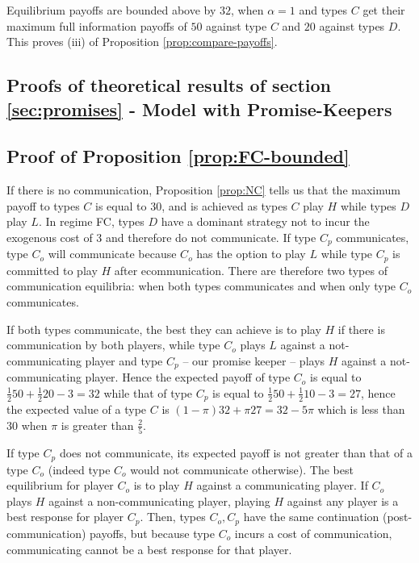 \documentclass[12pt]{article}
\theoremstyle{break}
\begin{document}
Equilibrium payoffs are bounded above by $32$, when $\alpha=1$ and types $C$ get their maximum full information payoffs of $50$ against type $C$ and $20$ against types $D$. This proves (iii) of Proposition \ref{prop:compare-payoffs}.

%   
%    
\subsection{Proofs of theoretical results of section \ref{sec:promises}  - Model with Promise-Keepers}

\subsection*{Proof of Proposition \ref{prop:FC-bounded}}

	If there is no communication, Proposition \ref{prop:NC} tells us that the maximum payoff to types $C$ is equal to $30$, and is achieved as types $C$ play $H$ while types $D$ play $L$. In regime FC, types $D$ have a dominant strategy not to incur the exogenous cost of $3$ and therefore do not communicate. If type $C_p$ communicates, type $C_o$ will communicate because $C_o$ has the option to play $L$ while type $C_p$ is committed to play $H$ after ecommunication. There are therefore two types of communication equilibria: when both types communicates and when only type $C_o$ communicates. 
	
	If both types communicate, the best they can achieve is to play $H$ if there is communication by both players, while type $C_o$ plays $L$ against a not-communicating player and type $C_p$ -- our promise keeper -- plays $H$ against a not-communicating player. Hence the expected payoff of type $C_o$ is equal to $\frac{1}{2}50+\frac{1}{2}20-3=32$ while that of type $C_p$ is equal to $\frac{1}{2}50+\frac{1}{2}10-3=27$, hence the expected value of a type $C$ is $(1-\pi)32+\pi 27=32-5\pi$ which is less than $30$ when $\pi$ is greater than $\frac{2}{5}$. 

	If type $C_p$ does not communicate, its expected payoff is not greater than that of a type $C_o$ (indeed type $C_o$ would not communicate otherwise). The best equilibrium for player $C_o$ is to play $H$ against a communicating player. If $C_o$ plays $H$ against a non-communicating player, playing $H$ against any player is a best response for player $C_p$. Then, types $C_o,C_p$ have the same continuation (post-communication) payoffs, but because type $C_o$ incurs a cost of communication, communicating cannot be a best response for that player. 
	
\end{document}
